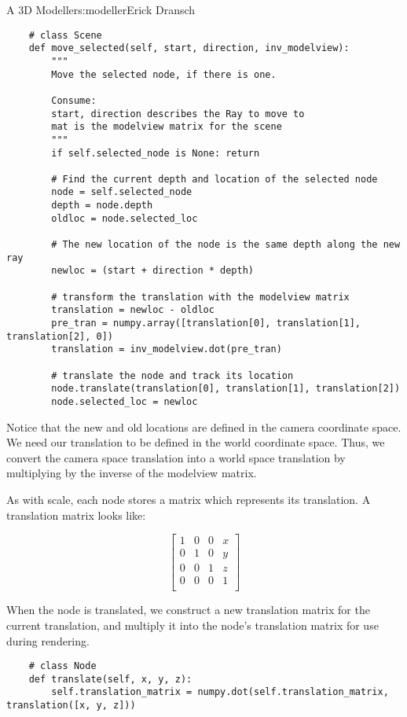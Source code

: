 \begin{aosachapter}{A 3D Modeller}{s:modeller}{Erick Dransch}
\begin{verbatim}
    # class Scene
    def move_selected(self, start, direction, inv_modelview):
        """ 
        Move the selected node, if there is one.
            
        Consume: 
        start, direction describes the Ray to move to
        mat is the modelview matrix for the scene 
        """
        if self.selected_node is None: return
    
        # Find the current depth and location of the selected node
        node = self.selected_node
        depth = node.depth
        oldloc = node.selected_loc
    
        # The new location of the node is the same depth along the new ray
        newloc = (start + direction * depth)
    
        # transform the translation with the modelview matrix
        translation = newloc - oldloc
        pre_tran = numpy.array([translation[0], translation[1], translation[2], 0])
        translation = inv_modelview.dot(pre_tran)
    
        # translate the node and track its location
        node.translate(translation[0], translation[1], translation[2])
        node.selected_loc = newloc
\end{verbatim}

Notice that the new and old locations are defined in the camera
coordinate space. We need our translation to be defined in the world
coordinate space. Thus, we convert the camera space translation into a
world space translation by multiplying by the inverse of the modelview
matrix.

As with scale, each node stores a matrix which represents its
translation. A translation matrix looks like:

\[
   \begin{bmatrix}
   1 & 0 & 0 & x \\
   0 & 1 & 0 & y \\
   0 & 0 & 1 & z \\
   0 & 0 & 0 & 1 \\
   \end{bmatrix}
\]

When the node is translated, we construct a new translation matrix for
the current translation, and multiply it into the node's translation
matrix for use during rendering.

\begin{verbatim}
    # class Node
    def translate(self, x, y, z):
        self.translation_matrix = numpy.dot(self.translation_matrix, translation([x, y, z]))
\end{verbatim}


\end{aosachapter}
